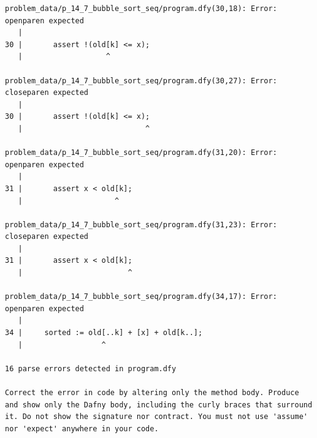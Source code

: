 \documentclass{article}
\begin{document}
\begin{lstlisting}
problem_data/p_14_7_bubble_sort_seq/program.dfy(30,18): Error: openparen expected
   |
30 |       assert !(old[k] <= x);
   |                   ^

problem_data/p_14_7_bubble_sort_seq/program.dfy(30,27): Error: closeparen expected
   |
30 |       assert !(old[k] <= x);
   |                            ^

problem_data/p_14_7_bubble_sort_seq/program.dfy(31,20): Error: openparen expected
   |
31 |       assert x < old[k];
   |                     ^

problem_data/p_14_7_bubble_sort_seq/program.dfy(31,23): Error: closeparen expected
   |
31 |       assert x < old[k];
   |                        ^

problem_data/p_14_7_bubble_sort_seq/program.dfy(34,17): Error: openparen expected
   |
34 |     sorted := old[..k] + [x] + old[k..];
   |                  ^

16 parse errors detected in program.dfy

Correct the error in code by altering only the method body. Produce and show only the Dafny body, including the curly braces that surround it. Do not show the signature nor contract. You must not use 'assume' nor 'expect' anywhere in your code.
\end{lstlisting}
\end{document}
